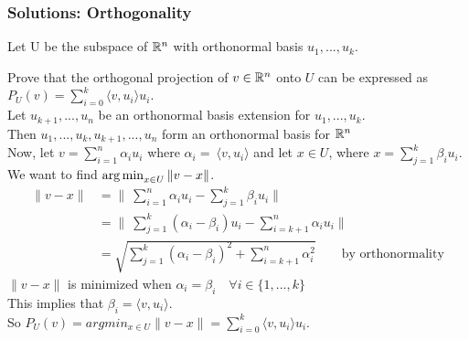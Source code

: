 \documentclass{beamer}
\newcommand\fonteight{\fontsize{8}{9.6}\selectfont}
\renewenvironment{enumerate}%
{\begin{list}{\arabic{enumi}.}%
      {\setlength{\leftmargin}{2.5em}%
       \setlength{\itemsep}{-\parsep}%
       \setlength{\topsep}{-\parskip}%
       \usecounter{enumi}}%
 }{\end{list}}
\begin{document}
\setlength{\abovedisplayskip}{0pt}%
\setlength{\belowdisplayskip}{0pt}%
\setlength{\abovedisplayshortskip}{0pt}%
\setlength{\belowdisplayshortskip}{0pt}%
\setlength{\jot}{0pt}
\begin{frame}
\frametitle{Solutions: Orthogonality}

\begin{solution}
\fonteight
Let U be the subspace of $\mathbb{R}^n$ with orthonormal basis $u_1,...,u_k$.
\begin{enumerate}
\item[2i.] Prove that the orthogonal projection of $v \in \mathbb{R}^n$ onto $U$ can be expressed as $P_U(v)  = \sum_{i=0}^k  \langle v,u_i \rangle u_i$. \\

Let $u_{k+1},...,u_n$ be an orthonormal basis extension for $ u_1,...,u_k$.\\
Then $u_1,...,u_k,u_{k+1},...,u_n$ form an orthonormal basis for $\mathbb{R}^n$\\
Now, let $v = \sum_{i=1}^n \alpha_i u_i$ where $\alpha_i=\  \langle v,u_i \rangle $ and let $x\in U$, where $x=\sum_{j=1}^k  \beta_i u_i$.\\
We want to find $\operatorname*{arg\,min}_{x\in U} \|v-x\|$.
\begin{align*}
 \|v-x\| &= \|\ \sum_{i=1}^n \alpha_i u_i - \sum_{j=1}^k  \beta_i u_i \| \\
         &= \|\ \sum_{j=1}^k (\alpha_i-\beta_i) u_i - \sum_{i=k+1}^n  \alpha_i u_i \| \\
         &= \sqrt{\sum_{j=1}^k (\alpha_i-\beta_i)^2 + \sum_{i=k+1}^n  \alpha_i^2} \qquad \text{by orthonormality}
\end{align*}
$\|v-x\|$ is minimized when $\alpha_i = \beta_i \quad \forall i \in \{1,...,k\}$\\
This implies that $\beta_i =  \langle v,u_i \rangle $.\\
 So $P_U(v)=argmin_{x\in U}\|v-x\| = \sum_{i=0}^k  \langle v,u_i \rangle u_i$.
\end{enumerate}
\end{solution}
\end{frame}
\end{document}
